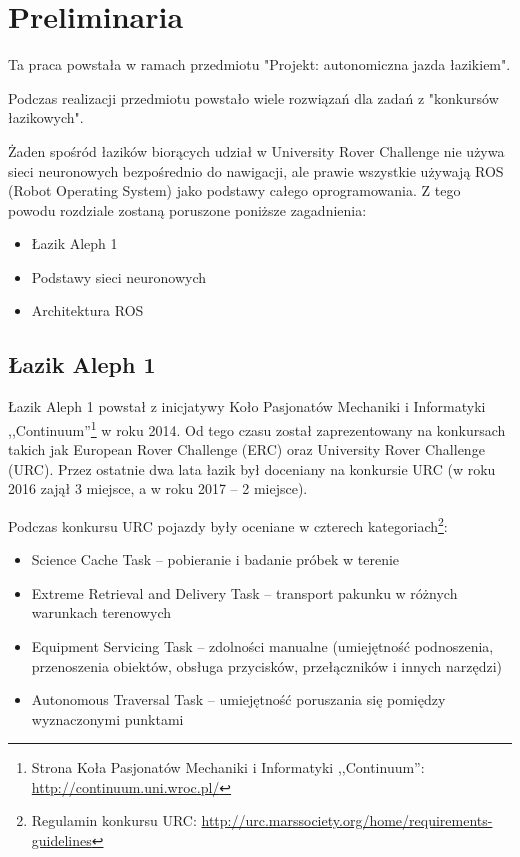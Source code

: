 \chapter{Preliminaria}
Ta praca 
powstała w ramach przedmiotu "Projekt: autonomiczna jazda łazikiem".

Podczas realizacji przedmiotu powstało wiele rozwiązań dla zadań z 
"konkursów łazikowych".

Żaden spośród łazików biorących udział w University Rover Challenge nie 
używa sieci neuronowych bezpośrednio do nawigacji, ale prawie wszystkie używają
ROS (Robot Operating System) jako podstawy całego oprogramowania. Z tego powodu
rozdziale zostaną poruszone poniższe zagadnienia:
\begin{itemize}
  \item Łazik Aleph 1
  \item Podstawy sieci neuronowych
  \item Architektura ROS
\end{itemize}
\section {Łazik Aleph 1}
Łazik Aleph 1 powstał z inicjatywy 
Koło Pasjonatów Mechaniki i Informatyki ,,Continuum''\footnote{ Strona Koła Pasjonatów Mechaniki i Informatyki ,,Continuum'':
\href{http://continuum.uni.wroc.pl/}{http://continuum.uni.wroc.pl/}}
w roku 2014. Od tego czasu został zaprezentowany na konkursach takich jak 
European Rover Challenge (ERC) oraz University Rover Challenge (URC). Przez ostatnie
dwa lata łazik był doceniany na konkursie URC (w roku 2016 zajął 3 miejsce, a w roku
2017 -- 2 miejsce).

Podczas konkursu URC pojazdy były oceniane w czterech kategoriach\footnote{
Regulamin konkursu URC: \href{http://urc.marssociety.org/home/requirements-guidelines}
{http://urc.marssociety.org/home/requirements-guidelines}}:
\begin{itemize}
  \item Science Cache Task -- pobieranie i badanie próbek w terenie 
  \item Extreme Retrieval and Delivery Task -- transport pakunku w różnych warunkach
    terenowych
  \item Equipment Servicing Task -- zdolności manualne (umiejętność podnoszenia,
    przenoszenia obiektów, obsługa przycisków, przełączników i innych narzędzi)
  \item Autonomous Traversal Task -- umiejętność poruszania się pomiędzy wyznaczonymi
    punktami
\end{itemize}


